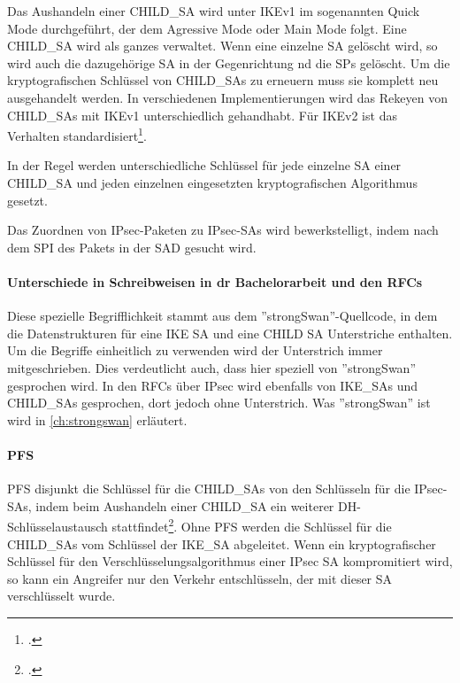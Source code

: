 Das Aushandeln einer CHILD\_SA wird unter IKEv1 im sogenannten Quick Mode durchgeführt, der dem Agressive Mode
oder Main Mode folgt.
Eine CHILD\_SA wird als ganzes verwaltet. Wenn eine einzelne \ac{SA} gelöscht wird, so wird
auch die dazugehörige \ac{SA} in der Gegenrichtung nd die \acp{SP} gelöscht.
Um die kryptografischen Schlüssel von CHILD\_SAs zu erneuern muss sie komplett neu ausgehandelt werden.
In verschiedenen Implementierungen wird das Rekeyen von CHILD\_SAs mit IKEv1 unterschiedlich gehandhabt.
Für IKEv2 ist das Verhalten standardisiert\footcite[][16]{charlie_kaufman_rfc_2014}.

In der Regel werden unterschiedliche Schlüssel für jede einzelne SA einer CHILD\_SA
und jeden einzelnen eingesetzten kryptografischen Algorithmus gesetzt.

Das Zuordnen von \ac{IPsec}-Paketen zu \ac{IPsec}-\acp{SA} wird bewerkstelligt,
indem nach dem \ac{SPI} des Pakets in der \ac{SAD} gesucht wird.

\paragraph{Unterschiede in Schreibweisen in dr Bachelorarbeit und den RFCs}
Diese spezielle Begrifflichkeit stammt aus dem ''strongSwan''-Quellcode, in dem
die Datenstrukturen für eine IKE SA und eine CHILD SA Unterstriche enthalten.
Um die Begriffe einheitlich zu verwenden wird der Unterstrich immer mitgeschrieben.
Dies verdeutlicht auch, dass hier speziell von ''strongSwan'' gesprochen wird.
In den \acp{RFC} über \ac{IPsec} wird ebenfalls von IKE\_SAs und CHILD\_SAs gesprochen,
dort jedoch ohne Unterstrich. Was ''strongSwan'' ist wird in \autoref{ch:strongswan} erläutert.

\paragraph{PFS}
\ac{PFS} disjunkt die Schlüssel für die CHILD\_SAs von den Schlüsseln
für die \ac{IPsec}-\acp{SA}, indem beim Aushandeln einer CHILD\_SA ein weiterer
\ac{DH}-Schlüsselaustausch stattfindet\footcite[13]{charlie_kaufman_rfc_2014}.
Ohne \ac{PFS} werden die Schlüssel für die CHILD\_SAs vom Schlüssel der IKE\_SA
abgeleitet. Wenn ein kryptografischer Schlüssel für den Verschlüsselungsalgorithmus
einer \ac{IPsec} \ac{SA} kompromitiert wird, so kann ein Angreifer nur den Verkehr entschlüsseln,
der mit dieser \ac{SA} verschlüsselt wurde.

